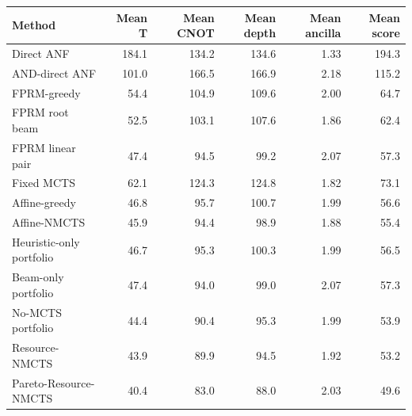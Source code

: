 \begin{tabular}{lrrrrr}
\toprule
Method & Mean T & Mean CNOT & Mean depth & Mean ancilla & Mean score \\
\midrule
Direct ANF & 184.1 & 134.2 & 134.6 & 1.33 & 194.3 \\
AND-direct ANF & 101.0 & 166.5 & 166.9 & 2.18 & 115.2 \\
FPRM-greedy & 54.4 & 104.9 & 109.6 & 2.00 & 64.7 \\
FPRM root beam & 52.5 & 103.1 & 107.6 & 1.86 & 62.4 \\
FPRM linear pair & 47.4 & 94.5 & 99.2 & 2.07 & 57.3 \\
Fixed MCTS & 62.1 & 124.3 & 124.8 & 1.82 & 73.1 \\
Affine-greedy & 46.8 & 95.7 & 100.7 & 1.99 & 56.6 \\
Affine-NMCTS & 45.9 & 94.4 & 98.9 & 1.88 & 55.4 \\
Heuristic-only portfolio & 46.7 & 95.3 & 100.3 & 1.99 & 56.5 \\
Beam-only portfolio & 47.4 & 94.0 & 99.0 & 2.07 & 57.3 \\
No-MCTS portfolio & 44.4 & 90.4 & 95.3 & 1.99 & 53.9 \\
Resource-NMCTS & 43.9 & 89.9 & 94.5 & 1.92 & 53.2 \\
Pareto-Resource-NMCTS & 40.4 & 83.0 & 88.0 & 2.03 & 49.6 \\
\bottomrule
\end{tabular}
